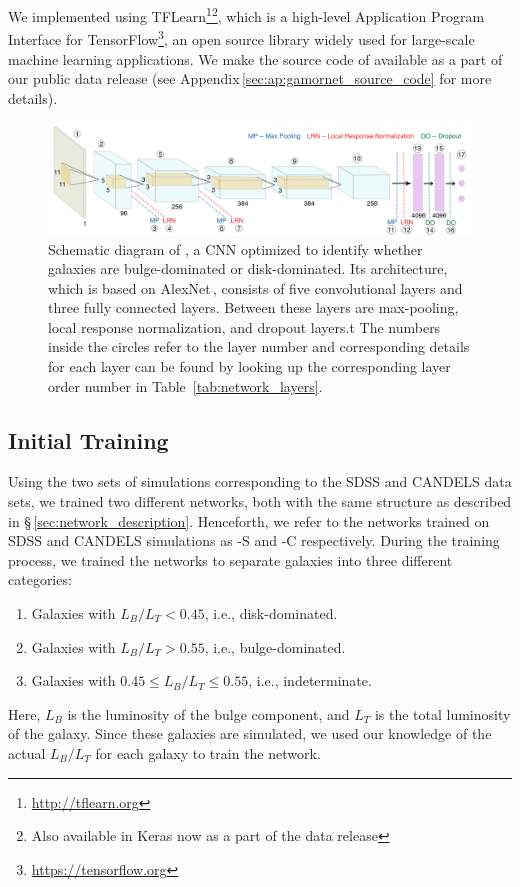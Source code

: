 We implemented \gamornet{} using TFLearn\footnote{\href{http://tflearn.org}{http://tflearn.org}}\footnote{Also available in Keras now as a part of the data release}, which is a high-level Application Program Interface for TensorFlow\footnote{\href{https://tensorflow.org}{https://tensorflow.org}}, an open source library widely used for large-scale machine learning applications. We make the source code of \gamornet{} available as a part of our public data release (see Appendix\,\ref{sec:ap:gamornet_source_code} for more details).

\begin{figure}[htb]
    \centering
    \includegraphics[width = \textwidth]{galmnet_schematic_coloured.pdf}
    \caption{Schematic diagram of \gamornet{}, a CNN optimized to identify whether galaxies are bulge-dominated or disk-dominated. Its architecture, which is based on AlexNet\,\citep{alexnet}, consists of five convolutional layers and three fully connected layers. Between these layers are max-pooling, local response normalization, and dropout layers.t The numbers inside the circles refer to the layer number and corresponding details for each layer can be found by looking up the corresponding layer order number in Table~\ref{tab:network_layers}. }
    \label{fig:galmnet_schematic}
\end{figure}

\subsection{Initial Training} \label{sec:initial_training}
 Using the two sets of simulations corresponding to the SDSS and CANDELS data sets, we trained two different networks, both with the same structure as described in \S\,\ref{sec:network_description}. Henceforth, we refer to the networks trained on SDSS and CANDELS simulations as \gamornet{}-S and \gamornet{}-C respectively. During the training process, we trained the networks to separate galaxies into three different categories:
\begin{enumerate}[noitemsep]
\item Galaxies with $L_B/L_T < 0.45 $, i.e., disk-dominated.
\item Galaxies with $L_B/L_T > 0.55 $, i.e., bulge-dominated.
\item Galaxies with $ 0.45 \leq L_B/L_T \leq 0.55 $, i.e., indeterminate.
\end{enumerate}
Here, $L_B$ is the luminosity of the bulge component, and $L_T$ is the total luminosity of the galaxy. Since these galaxies are simulated, we used our knowledge of the actual $L_B/L_T$ for each galaxy to train the network.

